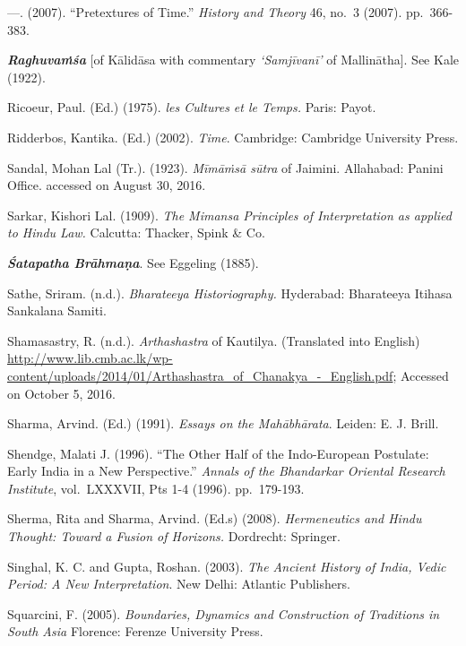 \begin{thebibliography}{99}
  —. (2007). “Pretextures of Time.” \textit{History and Theory} 46, no.~3 (2007). pp.~366-383.

  \textbf{\textit{Raghuvaṁśa}} [of Kālidāsa with commentary \textit{‘Samjīvanī’} of Mallinātha]. See Kale (1922).

  Ricoeur, Paul. (Ed.) (1975). \textit{les Cultures et le Temps.} Paris: Payot.

  Ridderbos, Kantika. (Ed.) (2002). \textit{Time}. Cambridge: Cambridge University Press.

  Sandal, Mohan Lal (Tr.). (1923). \textit{Mīmāṁsā sūtra} of Jaimini. Allahabad: Panini Office. accessed on August 30, 2016.

  Sarkar, Kishori Lal. (1909). \textit{The Mimansa Principles of Interpretation as applied to Hindu Law.} Calcutta: Thacker, Spink \& Co. 

  \textbf{\textit{Śatapatha Brāhmaṇa}}. See Eggeling (1885).

  Sathe, Sriram. (n.d.). \textit{Bharateeya Historiography.} Hyderabad: Bharateeya Itihasa Sankalana Samiti.

  Shamasastry, R. (n.d.). \textit{Arthashastra} of Kautilya. (Translated into English) \url{http://www.lib.cmb.ac.lk/wp-content/uploads/2014/01/Arthashastra_of_Chanakya_-_English.pdf}; Accessed on October 5, 2016.

  Sharma, Arvind. (Ed.) (1991). \textit{Essays on the Mahābhārata}. Leiden: E. J. Brill.

  Shendge, Malati J. (1996). “The Other Half of the Indo-European Postulate: Early India in a New Perspective.” \textit{Annals of the Bhandarkar Oriental Research Institute}, vol.~LXXXVII, Pts 1-4 (1996). pp.~179-193.

  Sherma, Rita and Sharma, Arvind. (Ed.s) (2008). \textit{Hermeneutics and Hindu Thought: Toward a Fusion of Horizons.} Dordrecht: Springer.

  Singhal, K. C. and Gupta, Roshan. (2003). \textit{The Ancient History of India, Vedic Period: A New Interpretation}. New Delhi: Atlantic Publishers.

  Squarcini, F. (2005). \textit{Boundaries, Dynamics and Construction of Traditions in South Asia} Florence: Ferenze University Press.


\end{thebibliography}
